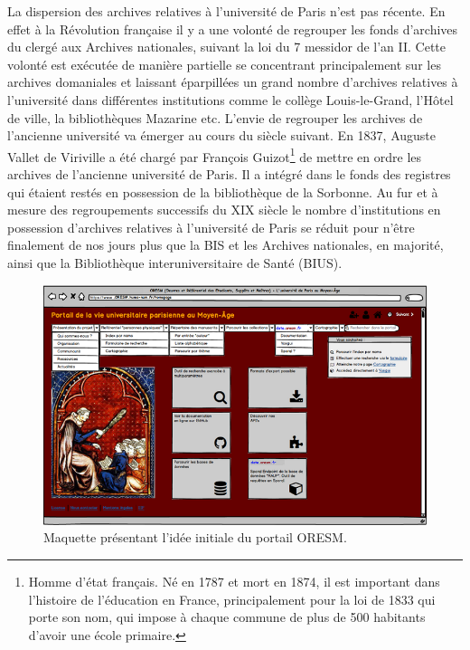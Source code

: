 \par
La dispersion des archives relatives à l'université de Paris n'est pas récente. En effet à la Révolution française il y a une volonté de regrouper les fonds d'archives du clergé aux Archives nationales,  suivant la loi du 7 messidor de l'an II. Cette volonté est exécutée de manière partielle se concentrant principalement sur les archives domaniales et laissant éparpillées un grand nombre d'archives relatives à l'université dans différentes institutions comme le collège Louis-le-Grand, l'Hôtel de ville, la bibliothèques Mazarine etc. L'envie de regrouper les archives de l'ancienne université va émerger au cours du siècle suivant. En 1837, Auguste Vallet de Viriville a été chargé par François Guizot\footnote{Homme d'état français. Né en 1787 et mort en 1874, il est important dans l'histoire de l'éducation en France, principalement pour la loi de 1833 qui porte son nom, qui impose à chaque commune de plus de 500 habitants d'avoir une école primaire.} de mettre en ordre les archives de l'ancienne université de Paris. Il a intégré dans le fonds des registres qui étaient restés en possession de la bibliothèque de la Sorbonne. Au fur et à mesure des regroupements successifs du \textsc{XIX}\ieme{} siècle le nombre d'institutions en possession d'archives relatives à l'université de Paris se réduit pour n'être finalement de nos jours plus que la BIS et les Archives nationales, en majorité, ainsi que la Bibliothèque interuniversitaire de Santé (BIUS).
\par
\begin{figure}[!h]
    \centering
    \includegraphics[width=1\linewidth]{images/oresm origine.png}
    \caption{Maquette présentant l'idée initiale du portail ORESM.}
    \label{fig:oresm-origine}
\end{figure}
